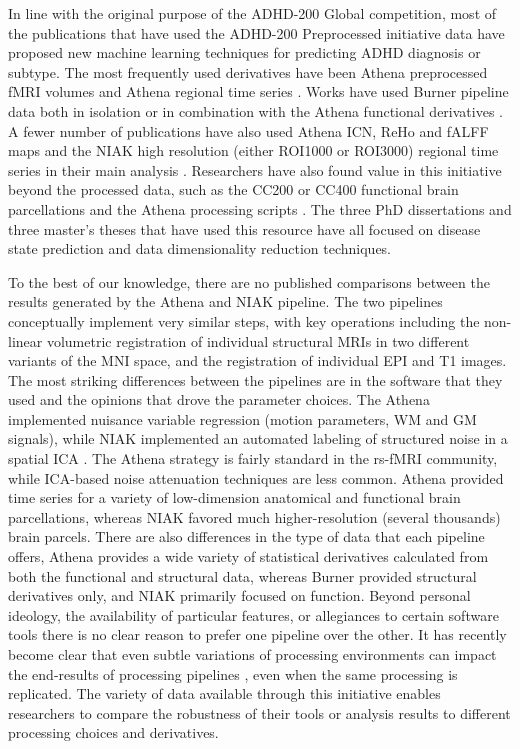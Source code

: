 \documentclass[preprint,12pt,3p]{elsarticle}
\begin{document}
In line with the original purpose of the ADHD-200 Global competition, most of the publications that have used the ADHD-200 Preprocessed initiative data have proposed new machine learning techniques for predicting ADHD diagnosis or subtype. The most frequently used derivatives have been Athena preprocessed fMRI volumes \citep[e.g.][]{Liang2012,Carmona2015} and Athena regional time series \citep[e.g.][]{Fujita2013,Dey2014}. Works have used Burner pipeline data both in isolation \citep[e.g.][]{Rangarajan2014,Rangarajan2015,Mahanand2013} or in combination with the Athena functional derivatives \citep[e.g.][]{Ji2011,Eloyan2012,Olivetti2014}. A fewer number of publications have also used Athena ICN, ReHo and fALFF maps \citep[e.g.][]{Sato2012a} and the NIAK high resolution (either ROI1000 or ROI3000) regional time series in their main analysis \citep[e.g.][]{Ahn2015,Yang2015}. Researchers have also found value in this initiative beyond the processed data, such as the CC200 or CC400 functional brain parcellations \citep[e.g.][]{Dey2012,Dai2012} and the Athena processing scripts \citep[.e.g][]{Fujita2015}. The three PhD dissertations \cite{Colby2012a, Dey2014phd, Zhang2012} and three master's theses \citep[][]{VanGalenLast2011,Wang2013,Vidal2014} that have used this resource have all focused on disease state prediction and data dimensionality reduction techniques.
\par
To the best of our knowledge, there are no published comparisons between the results generated by the Athena and NIAK pipeline. The two pipelines conceptually implement very similar steps, with key operations including the non-linear volumetric registration of individual structural MRIs in two different variants of the MNI space, and the registration of individual EPI and T1 images. The most striking differences between the pipelines are in the software that they used and the opinions that drove the parameter choices. The Athena implemented nuisance variable regression \citep{lund2006_nvr,fox2005} (motion parameters, WM and GM signals), while NIAK implemented an automated labeling of structured noise in a spatial ICA \citep{perlbarg2007corsica}. The Athena strategy is fairly standard in the rs-fMRI community, while ICA-based noise attenuation techniques are less common. Athena provided time series for a variety of low-dimension anatomical and functional brain parcellations, whereas NIAK favored much higher-resolution (several thousands) brain parcels. There are also differences in the type of data that each pipeline offers, Athena provides a wide variety of statistical derivatives calculated from both the functional and structural data, whereas Burner provided structural derivatives only, and NIAK primarily focused on function. Beyond personal ideology, the availability of particular features, or allegiances to certain software tools there is no clear reason to prefer one pipeline over the other.  It has recently become clear that even subtle variations of processing environments can impact the end-results of processing pipelines \citep{Glatard2015-we}, even when the same processing is replicated. The variety of data available through this initiative enables researchers to compare the robustness of their tools or analysis results to different processing choices and derivatives. 
\end{document}
